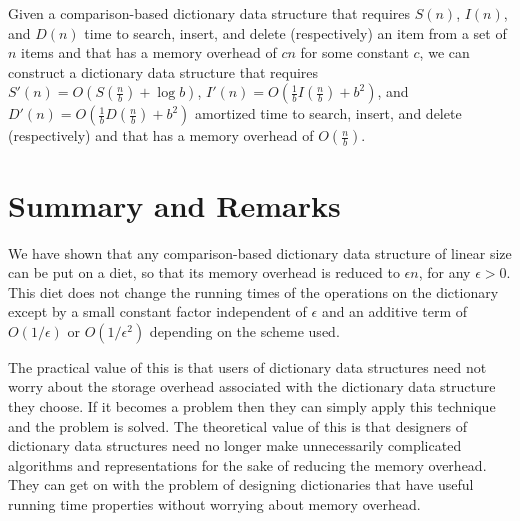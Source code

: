 \documentclass[lotsofwhite]{patmorin}
\begin{document}
\begin{thm}
Given a comparison-based dictionary data structure that requires
$S(n)$, $I(n)$, and $D(n)$ time to search, insert, and delete
(respectively) an item from a set of $n$ items and that has a memory
overhead of $cn$ for some constant $c$, we can construct a dictionary
data structure that requires $S'(n)=O(S(\frac{n}{b})+\log b)$,
$I'(n)=O(\frac{1}{b}I(\frac{n}{b})+b^2)$, and
$D'(n)=O(\frac{1}{b}D(\frac{n}{b})+b^2)$ amortized time to search,
insert, and delete (respectively) and that has a memory overhead of
$O(\frac{n}{b})$.
\end{thm}

\section{Summary and Remarks}

We have shown that any comparison-based dictionary data structure of
linear size can be put on a diet, so that its memory overhead is
reduced to $\epsilon n$, for any $\epsilon >0$. This diet does not
change the running times of the operations on the dictionary except by
a small constant factor independent of $\epsilon$ and an additive term
of $O(1/\epsilon)$ or $O(1/\epsilon^2)$ depending on the scheme used.

The practical value of this is that users of dictionary data
structures need not worry about the storage overhead associated with
the dictionary data structure they choose.  If it becomes a problem
then they can simply apply this technique and the problem is solved.
The theoretical value of this is that designers of dictionary data
structures need no longer make unnecessarily complicated algorithms
and representations for the sake of reducing the memory overhead.
They can get on with the problem of designing dictionaries that have
useful running time properties without worrying about memory overhead.




\end{document}
